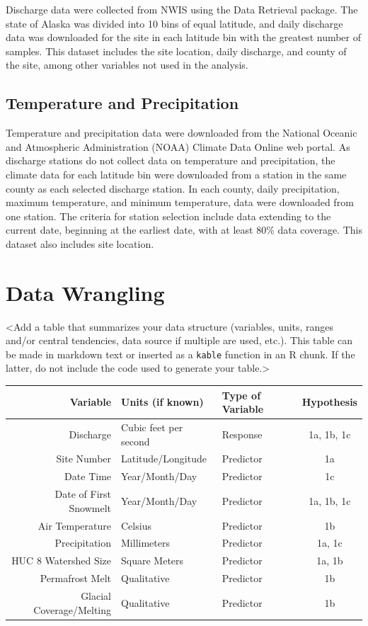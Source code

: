 \documentclass[12pt,]{article}
\begin{document}
Discharge data were collected from NWIS using the Data Retrieval
package. The state of Alaska was divided into 10 bins of equal latitude,
and daily discharge data was downloaded for the site in each latitude
bin with the greatest number of samples. This dataset includes the site
location, daily discharge, and county of the site, among other variables
not used in the analysis.

\hypertarget{temperature-and-precipitation}{%
\subsection{Temperature and
Precipitation}\label{temperature-and-precipitation}}

Temperature and precipitation data were downloaded from the National
Oceanic and Atmospheric Administration (NOAA) Climate Data Online web
portal. As discharge stations do not collect data on temperature and
precipitation, the climate data for each latitude bin were downloaded
from a station in the same county as each selected discharge station. In
each county, daily precipitation, maximum temperature, and minimum
temperature, data were downloaded from one station. The criteria for
station selection include data extending to the current date, beginning
at the earliest date, with at least 80\% data coverage. This dataset
also includes site location.

\newpage

\hypertarget{data-wrangling}{%
\section{Data Wrangling}\label{data-wrangling}}

\textless{}Add a table that summarizes your data structure (variables,
units, ranges and/or central tendencies, data source if multiple are
used, etc.). This table can be made in markdown text or inserted as a
\texttt{kable} function in an R chunk. If the latter, do not include the
code used to generate your table.\textgreater{}

\begin{longtable}[]{@{}rllc@{}}
\toprule
Variable & Units (if known) & Type of Variable &
Hypothesis\tabularnewline
\midrule
\endhead
Discharge & Cubic feet per second & Response & 1a, 1b, 1c\tabularnewline
Site Number & Latitude/Longitude & Predictor & 1a\tabularnewline
Date Time & Year/Month/Day & Predictor & 1c\tabularnewline
Date of First Snowmelt & Year/Month/Day & Predictor & 1a, 1b,
1c\tabularnewline
Air Temperature & Celsius & Predictor & 1b\tabularnewline
Precipitation & Millimeters & Predictor & 1a, 1c\tabularnewline
HUC 8 Watershed Size & Square Meters & Predictor & 1a, 1b\tabularnewline
Permafrost Melt & Qualitative & Predictor & 1b\tabularnewline
Glacial Coverage/Melting & Qualitative & Predictor & 1b\tabularnewline
\bottomrule
\end{longtable}
\end{document}
